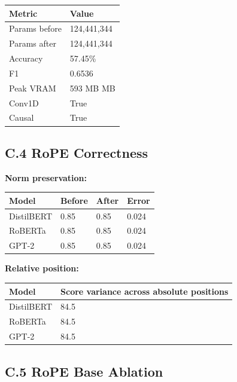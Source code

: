 \begin{table}[H]
\centering
\small
\begin{tabular}{ll}
\toprule
\textbf{Metric} & \textbf{Value} \\
\midrule
Params before & 124,441,344 \\
Params after & 124,441,344 \\
Accuracy & 57.45\% \\
F1 & 0.6536 \\
Peak VRAM & 593 MB MB \\
Conv1D & True \\
Causal & True \\
\bottomrule
\end{tabular}
\end{table}

\subsection{C.4 RoPE Correctness}

\textbf{Norm preservation:}

\begin{table}[H]
\centering
\small
\begin{tabular}{llll}
\toprule
\textbf{Model} & \textbf{Before} & \textbf{After} & \textbf{Error} \\
\midrule
DistilBERT & 0.85 & 0.85 & 0.024 \\
RoBERTa & 0.85 & 0.85 & 0.024 \\
GPT-2 & 0.85 & 0.85 & 0.024 \\
\bottomrule
\end{tabular}
\end{table}

\textbf{Relative position:}

\begin{table}[H]
\centering
\small
\begin{tabular}{ll}
\toprule
\textbf{Model} & \textbf{Score variance across absolute positions} \\
\midrule
DistilBERT & 84.5 \\
RoBERTa & 84.5 \\
GPT-2 & 84.5 \\
\bottomrule
\end{tabular}
\end{table}

\subsection{C.5 RoPE Base Ablation}

